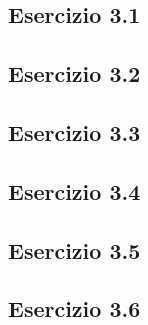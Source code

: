 \subsection{\textbf{Esercizio 3.1}}

\subsection{\textbf{Esercizio 3.2}}

\subsection{\textbf{Esercizio 3.3}}

\subsection{\textbf{Esercizio 3.4}}

\subsection{\textbf{Esercizio 3.5}}

\subsection{\textbf{Esercizio 3.6}}
